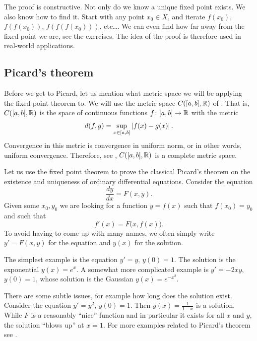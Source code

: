 The proof is constructive.  Not only do we know 
a unique fixed point exists.  We also know how to find it.  Start with
any point $x_0 \in X$, and iterate $f(x_0)$,
$f(f(x_0))$,
$f(f(f(x_0)))$, etc\ldots.  We can even find how far away
from the fixed point we are, see the exercises.  The idea of the proof is
therefore used in real-world applications.

\subsection{Picard's theorem}

Before we get to Picard, let us mention what metric space we will be
applying the fixed point theorem to.  We will use the metric space
$C([a,b],{\mathbb{R}})$ of .  That is, $C([a,b],{\mathbb{R}})$
is the space of continuous functions $f \colon [a,b] \to {\mathbb{R}}$ with the metric
\begin{equation*}
d(f,g) = \sup_{x \in [a,b]} \left\lvert {f(x)-g(x)} \right\rvert .
\end{equation*}
Convergence in this metric is convergence in uniform norm, or in other
words, uniform convergence.  Therefore, see
, $C([a,b],{\mathbb{R}})$ is a complete metric space.

\medskip

Let us use the
fixed point theorem
to prove the classical Picard's theorem on the existence and uniqueness of
ordinary differential equations.
Consider the equation
\begin{equation*}
\frac{dy}{dx} = F(x,y) .
\end{equation*}
Given some $x_0, y_0$ we are looking for a function $y=f(x)$ such that
$f(x_0) = y_0$ and such that
\begin{equation*}
f'(x) = F\bigl(x,f(x)\bigr) .
\end{equation*}
To avoid having to come up with many names, we often simply write $y' = F(x,y)$
for the equation
and $y(x)$ for the solution.

The simplest example is the equation $y' = y$, $y(0) = 1$.
The solution is the exponential $y(x) = e^x$.  A somewhat more complicated
example is $y' = -2xy$, $y(0) = 1$, whose solution is the Gaussian
$y(x) = e^{-x^2}$.

There are some subtle issues, for example how long does the
solution exist.
Consider the equation $y' = y^2$, $y(0)=1$.  Then $y(x) = \frac{1}{1-x}$ is a
solution.  While $F$ is a reasonably ``nice'' function and in particular
it exists for all $x$ and $y$, the solution ``blows up'' at $x=1$.
For more examples related to Picard's theorem see .

